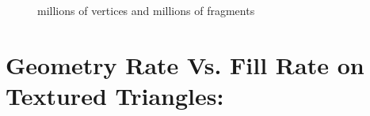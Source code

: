 \documentclass[12pt] {article}
\begin{document}
\begin{figure}[!tbh]
 \centering  
  \caption{millions of vertices and millions of fragments }
   \label{fig:fill_geo2}
\end{figure} 

\section{Geometry Rate Vs. Fill Rate on Textured Triangles:}





\end{document}
